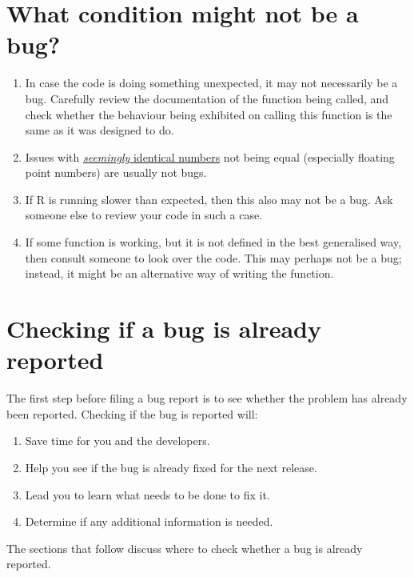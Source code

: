 \documentclass[
]{book}
\begin{document}
\section{What condition might not be a bug?}\label{what-condition-might-not-be-a-bug}

\begin{enumerate}
\def\labelenumi{\arabic{enumi}.}
\item
  In case the code is doing something unexpected, it may not necessarily be a bug. Carefully review the documentation of the function being called, and check whether the behaviour being exhibited on calling this function is the same as it was designed to do.
\item
  Issues with \href{https://cran.r-project.org/doc/FAQ/R-FAQ.html\#Why-doesn_0027t-R-think-these-numbers-are-equal_003f}{\emph{seemingly} identical numbers} not being equal (especially floating point numbers) are usually not bugs.
\item
  If R is running slower than expected, then this also may not be a bug. Ask someone else to review your code in such a case.
\item
  If some function is working, but it is not defined in the best generalised way, then consult someone to look over the code. This may perhaps not be a bug; instead, it might be an alternative way of writing the function.
\end{enumerate}

\section{Checking if a bug is already reported}\label{already-reported-bugs}

The first step before filing a bug report is to see whether the problem has already been reported. Checking if the bug is reported will:

\begin{enumerate}
\def\labelenumi{\arabic{enumi}.}
\item
  Save time for you and the developers.
\item
  Help you see if the bug is already fixed for the next release.
\item
  Lead you to learn what needs to be done to fix it.
\item
  Determine if any additional information is needed.
\end{enumerate}

The sections that follow discuss where to check whether a bug is already reported.
\end{document}

